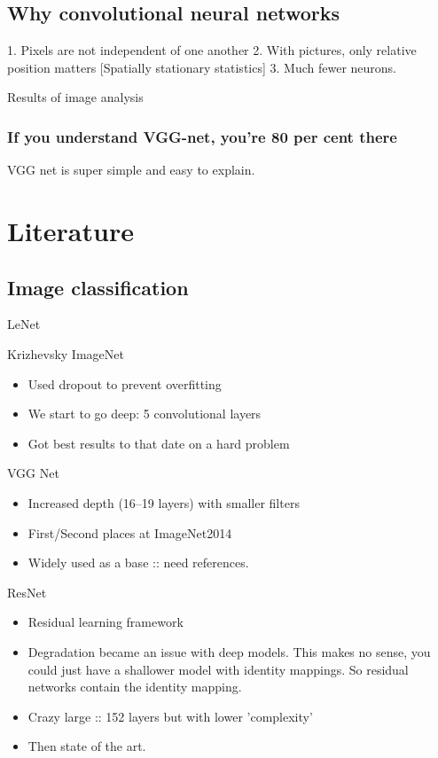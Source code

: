\documentclass[12pt, a4paper, oneside, headinclude, footinclude]{article}
\begin{document}
\subsection{Why convolutional neural networks}

1. Pixels are not independent of one another
2. With pictures, only relative position matters [Spatially stationary
statistics]
3. Much fewer neurons.

Results of image analysis

\subsubsection{If you understand VGG-net, you're 80 per cent there}

VGG net is super simple and easy to explain.

\section{Literature}

\subsection{Image classification}

LeNet

Krizhevsky ImageNet~\cite{NIPS2012_4824}
\begin{itemize}
    \item Used dropout to prevent overfitting
    \item We start to go deep: 5 convolutional layers
    \item Got best results to that date on a hard problem
\end{itemize}


VGG Net~\cite{SimonyanZ14a}
\begin{itemize}
    \item Increased depth (16--19 layers) with smaller filters
    \item First/Second places at ImageNet2014
    \item Widely used as a base :: need references.
\end{itemize}

ResNet~\cite{he2016deep}

\begin{itemize}
    \item Residual learning framework
    \item Degradation became an issue with deep models. This makes no sense,
        you could just have a shallower model with identity mappings. So
        residual networks contain the identity mapping.
    \item Crazy large :: 152 layers but with lower 'complexity'
    \item Then state of the art.
\end{itemize}
\end{document}
